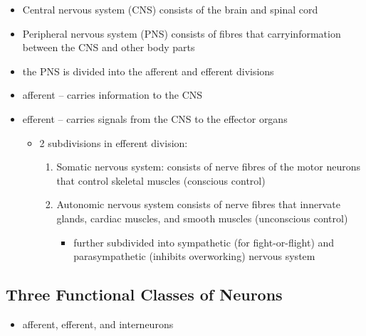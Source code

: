 \documentclass[10pt]{article}
\begin{document}
\begin{itemize}
    \item Central nervous system (CNS) consists of the brain and spinal cord 
    \item Peripheral nervous system (PNS) consists of fibres that carryinformation between the CNS and other body parts 
    \item the PNS is divided into the afferent and efferent divisions
    \item afferent -- carries information to the CNS 
    \item efferent -- carries signals from the CNS to the effector organs 
        \begin{itemize}
            \item 2 subdivisions in efferent division:
                \begin{enumerate}
                    \item Somatic nervous system: consists of nerve fibres of the motor neurons that control skeletal muscles (conscious control)
                    \item Autonomic nervous system consists of nerve fibres that innervate glands, cardiac muscles, and smooth muscles (unconscious control)
                        \begin{itemize}
                            \item further subdivided into sympathetic (for fight-or-flight) and parasympathetic (inhibits overworking) nervous system
                        \end{itemize}
                \end{enumerate}
        \end{itemize}
\end{itemize}

\subsection{Three Functional Classes of Neurons}
\begin{itemize}
    \item afferent, efferent, and interneurons
\end{itemize}
\end{document}
